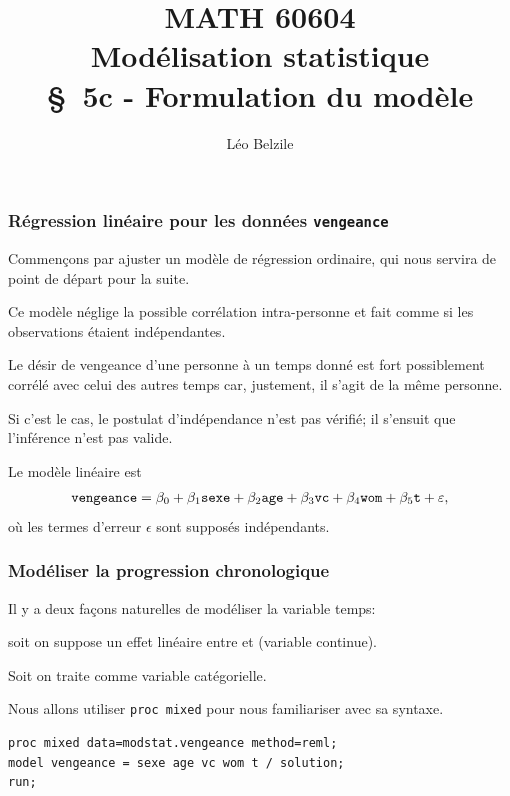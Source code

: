 \documentclass{beamer}
\title[\color{white}{MATH 60604 \S~5c - Formulation du modèle}]{\texorpdfstring{MATH 60604 \\Modélisation statistique \\ \S~5c - Formulation du modèle}{MATH 60604 \\Modélisation statistique \\ \S~5c - Formulation du modèle}}
\author{Léo Belzile}
\institute{HEC Montréal\\
Département de sciences de la décision}
\date{}
\begin{document}
\frame{\titlepage}


\begin{frame}[fragile]
\frametitle{Régression linéaire pour les données \texttt{vengeance}}
\bi
\item  Commençons par ajuster un modèle de régression ordinaire, qui nous servira de
point de départ pour la suite. 
\item Ce modèle néglige la possible corrélation intra-personne et fait
comme si les observations étaient indépendantes.
\bi

\item  Le désir de vengeance d'une personne à un temps donné est fort
possiblement corrélé avec celui des autres temps car, justement, il s'agit de la
même personne. 
\item Si c'est le cas, le postulat d'indépendance n'est pas vérifié; il s'ensuit que l'inférence n'est
pas valide.
\ei
\item Le modèle linéaire est
\begin{align*}
\texttt{vengeance} = \beta_0+\beta_1 \texttt{sexe} + \beta_2 \texttt{age} + \beta_3 \texttt{vc} + \beta_4 \texttt{wom} + \beta_5 \texttt{t} + \varepsilon, 
\end{align*}
où les termes d'erreur $\epsilon$ sont supposés indépendants.
\ei
\end{frame}

\begin{frame}[fragile]
\frametitle{Modéliser la progression chronologique}
\bi
\item Il y a deux façons naturelles de modéliser la variable temps:
\bi

\item soit on suppose un effet linéaire entre  et  (variable continue).
\item Soit on traite  comme variable catégorielle. 
\ei

\item  Nous allons utiliser \texttt{proc mixed} pour nous familiariser avec sa syntaxe.
 
\begin{tcolorbox}[olback=white, colframe=hecblue, title=Code SAS pour ajuster un modèle linéaire]
\begin{verbatim}
proc mixed data=modstat.vengeance method=reml;
model vengeance = sexe age vc wom t / solution;
run;
\end{verbatim}
\end{tcolorbox}
\ei
\end{frame}
\end{document}
